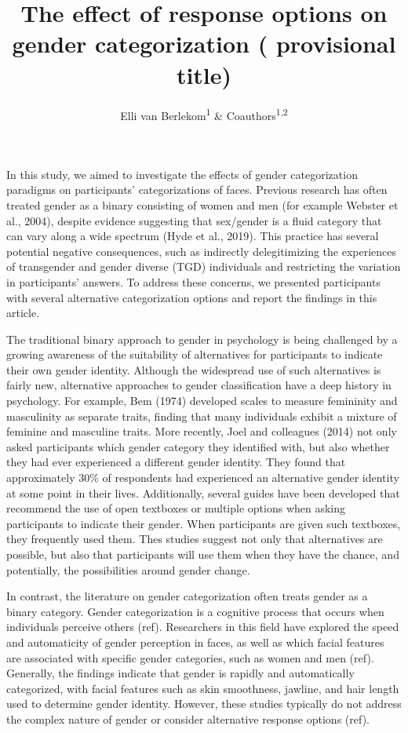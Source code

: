 \documentclass[
  man]{apa7}
\title{The effect of response options on gender categorization ( provisional title)}
\author{Elli van Berlekom\textsuperscript{1} \& Coauthors\textsuperscript{1,2}}
\date{}
\affiliation{\vspace{0.5cm}\textsuperscript{1} Stockholm University\\\textsuperscript{2} Lund University}
\begin{document}
\maketitle

In this study, we aimed to investigate the effects of gender categorization paradigms on participants' categorizations of faces. Previous research has often treated gender as a binary consisting of women and men (for example Webster et al., 2004), despite evidence suggesting that sex/gender is a fluid category that can vary along a wide spectrum (Hyde et al., 2019). This practice has several potential negative consequences, such as indirectly delegitimizing the experiences of transgender and gender diverse (TGD) individuals and restricting the variation in participants' answers. To address these concerns, we presented participants with several alternative categorization options and report the findings in this article.

The traditional binary approach to gender in psychology is being challenged by a growing awareness of the suitability of alternatives for participants to indicate their own gender identity. Although the widespread use of such alternatives is fairly new, alternative approaches to gender classification have a deep history in psychology. For example, Bem (1974) developed scales to measure femininity and masculinity as separate traits, finding that many individuals exhibit a mixture of feminine and masculine traits. More recently, Joel and colleagues (2014) not only asked participants which gender category they identified with, but also whether they had ever experienced a different gender identity. They found that approximately 30\% of respondents had experienced an alternative gender identity at some point in their lives. Additionally, several guides have been developed that recommend the use of open textboxes or multiple options when asking participants to indicate their gender. When participants are given such textboxes, they frequently used them. Thes studies suggest not only that alternatives are possible, but also that participants will use them when they have the chance, and potentially, the possibilities around gender change.

In contrast, the literature on gender categorization often treats gender as a binary category. Gender categorization is a cognitive process that occurs when individuals perceive others (ref). Researchers in this field have explored the speed and automaticity of gender perception in faces, as well as which facial features are associated with specific gender categories, such as women and men (ref). Generally, the findings indicate that gender is rapidly and automatically categorized, with facial features such as skin smoothness, jawline, and hair length used to determine gender identity. However, these studies typically do not address the complex nature of gender or consider alternative response options (ref).
\end{document}
